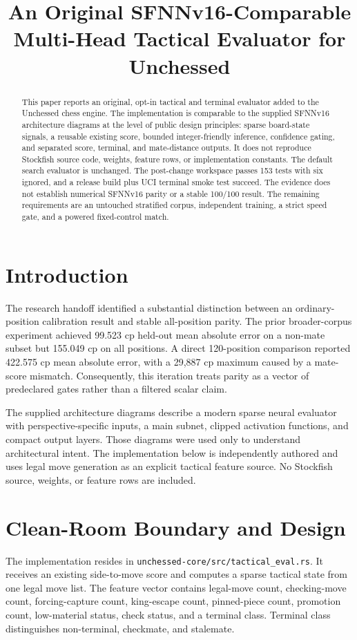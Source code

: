\documentclass[conference]{IEEEtran}
\title{An Original SFNNv16-Comparable Multi-Head Tactical Evaluator for Unchessed}
\author{\IEEEauthorblockN{Manus AI Research}\IEEEauthorblockA{Unchessed-UCI-Engine\newline Clean-room implementation branch: manus/research-facilities}}
\begin{document}
\maketitle

\begin{abstract}
This paper reports an original, opt-in tactical and terminal evaluator added to the Unchessed chess engine. The implementation is comparable to the supplied SFNNv16 architecture diagrams at the level of public design principles: sparse board-state signals, a reusable existing score, bounded integer-friendly inference, confidence gating, and separated score, terminal, and mate-distance outputs. It does not reproduce Stockfish source code, weights, feature rows, or implementation constants. The default search evaluator is unchanged. The post-change workspace passes 153 tests with six ignored, and a release build plus UCI terminal smoke test succeed. The evidence does not establish numerical SFNNv16 parity or a stable 100/100 result. The remaining requirements are an untouched stratified corpus, independent training, a strict speed gate, and a powered fixed-control match.
\end{abstract}

\section{Introduction}
The research handoff identified a substantial distinction between an ordinary-position calibration result and stable all-position parity. The prior broader-corpus experiment achieved 99.523 cp held-out mean absolute error on a non-mate subset but 155.049 cp on all positions. A direct 120-position comparison reported 422.575 cp mean absolute error, with a 29,887 cp maximum caused by a mate-score mismatch. Consequently, this iteration treats parity as a vector of predeclared gates rather than a filtered scalar claim.

The supplied architecture diagrams describe a modern sparse neural evaluator with perspective-specific inputs, a main subnet, clipped activation functions, and compact output layers. Those diagrams were used only to understand architectural intent. The implementation below is independently authored and uses legal move generation as an explicit tactical feature source. No Stockfish source, weights, or feature rows are included.

\section{Clean-Room Boundary and Design}
The implementation resides in \texttt{unchessed-core/src/tactical\_eval.rs}. It receives an existing side-to-move score and computes a sparse tactical state from one legal move list. The feature vector contains legal-move count, checking-move count, forcing-capture count, king-escape count, pinned-piece count, promotion count, low-material status, check status, and a terminal class. Terminal class distinguishes non-terminal, checkmate, and stalemate.
\end{document}
